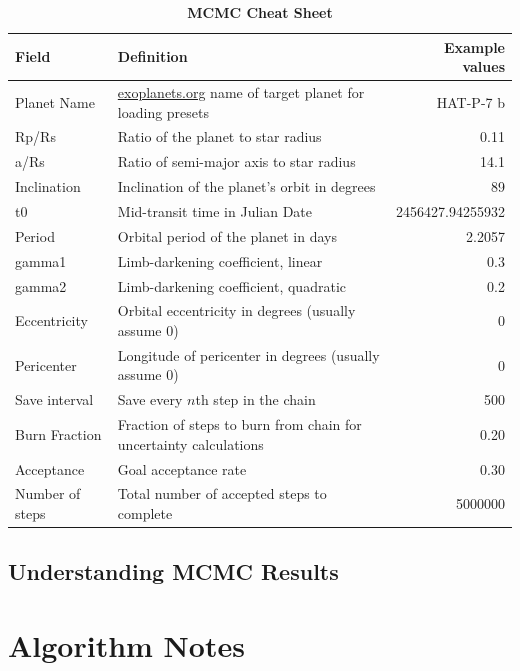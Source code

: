 \documentclass[a4paper]{article}
\begin{document}
\pagebreak
\begin{table}[H]
\renewcommand{\arraystretch}{1.5}
\centering
\caption{\textbf{MCMC Cheat Sheet}}
\begin{tabular}{p{0.8in} |  p{3.2in} r}
Field & Definition & Example values\\
\hline\hline
Planet Name & \href{http://www.exoplanets.org/}{exoplanets.org} name of target planet for loading presets & HAT-P-7 b\\
\hline
Rp/Rs & Ratio of the planet to star radius & 0.11\\
a/Rs & Ratio of semi-major axis to star radius & 14.1\\
Inclination & Inclination of the planet's orbit in degrees & 89 \\
t0 & Mid-transit time in Julian Date &  2456427.94255932\\
\hline
Period & Orbital period of the planet in days & 2.2057\\
gamma1 & Limb-darkening coefficient, linear & 0.3\\
gamma2 & Limb-darkening coefficient, quadratic & 0.2 \\
Eccentricity & Orbital eccentricity in degrees (usually assume 0) & 0 \\
Pericenter & Longitude of pericenter in degrees (usually assume 0) & 0\\
\hline
Save interval & Save every $n$th step in the chain & 500\\
Burn Fraction & Fraction of steps to burn from chain for uncertainty calculations & 0.20\\
Acceptance & Goal acceptance rate & 0.30\\
Number of steps & Total number of accepted steps to complete & 5000000\\
\hline 
\end{tabular}
\end{table}

\pagebreak

\subsection{Understanding MCMC Results}


\section{Algorithm Notes} \label{sec:algorithmNotes}
\end{document}
